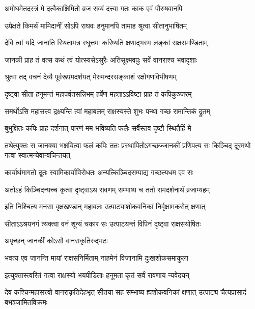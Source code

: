 \twolineshloka
{अमोघमेतदस्त्रं मे दत्वैकाक्षिमितो व्रज}
{सव्यं दत्त्वा गतः काक एवं पौरुषवानपि} %

\twolineshloka
{उपेक्षते किमर्थं मामिदानीं सोऽपि राघवः}
{हनुमानपि तामाह श्रुत्वा सीतानुभाषितम्} %

\twolineshloka
{देवि त्वां यदि जानाति स्थितामत्र रघूत्तमः}
{करिष्यति क्षणाद्भस्म लङ्कां राक्षसमण्डिताम्} %

\twolineshloka
{जानकी प्राह तं वत्स कथं त्वं योत्स्यसेऽसुरैः}
{अतिसूक्ष्मवपुः सर्वे वानराश्च भवादृशाः} %

\twolineshloka
{श्रुत्वा तद् वचनं देव्यै पूर्वरूपमदर्शयत्}
{मेरुमन्दरसङ्काशं रक्षोगणविभीषणम्} %

\twolineshloka
{दृष्ट्वा सीता हनूमन्तं महापर्वतसन्निभम्}
{हर्षेण महताऽऽविष्टा प्राह तं कपिकुञ्जरम्} %

\twolineshloka
{समर्थोऽसि महासत्त्व द्रक्ष्यन्ति त्वां महाबलम्}
{राक्षस्यस्ते शुभः पन्था गच्छ रामान्तिकं द्रुतम्} %

\twolineshloka
{बुभुक्षितः कपिः प्राह दर्शनात् पारणं मम}
{भविष्यति फलैः सर्वैस्तव दृष्टौ स्थितैर्हि मे} %

\threelineshloka
{तथेत्युक्तः स जानक्या भक्षयित्वा फलं कपिः}
{ततः प्रस्थापितोऽगच्छज्जानकीं प्रणिपत्य सः}
{किञ्चिद् दूरमथो गत्वा स्वात्मन्येवान्वचिन्तयत्} %

\twolineshloka
{कार्यार्थमागतो दूतः स्वामिकार्याविरोधतः}
{अन्यत्किञ्चिदसम्पाद्य गच्छत्यधम एव सः} %

\twolineshloka
{अतोऽहं किञ्चिदन्यच्च कृत्वा दृष्ट्वाऽथ रावणम्}
{सम्भाष्य च ततो रामदर्शनार्थं व्रजाम्यहम्} %

\twolineshloka
{इति निश्चित्य मनसा वृक्षखण्डान् महाबलः}
{उत्पाट्याशोकवनिकां निर्वृक्षामकरोत् क्षणात्} %

\twolineshloka
{सीताऽऽश्रयनगं त्यक्त्वा वनं शून्यं चकार सः}
{उत्पाटयन्तं विपिनं दृष्ट्वा राक्षसयोषितः} %

\onelineshloka
{अपृच्छन् जानकीं कोऽसौ वानराकृतिरुद्भटः} %



\twolineshloka
{भवत्य एव जानन्ति मायां राक्षसनिर्मिताम्}
{नाहमेनं विजानामि दुःखशोकसमाकुला} %

\twolineshloka
{इत्युक्तास्त्वरितं गत्वा राक्षस्यो भयपीडिताः}
{हनूमता कृतं सर्वं रावणाय न्यवेदयन्} %

\threelineshloka
{देव कश्चिन्महासत्त्वो वानराकृतिदेहभृत्}
{सीतया सह सम्भाष्य ह्यशोकवनिकां क्षणात्}
{उत्पाट्य चैत्यप्रासादं बभञ्जामितविक्रमः} %

